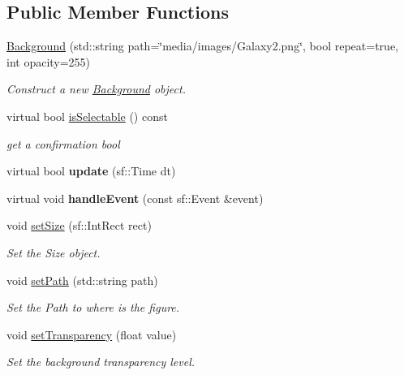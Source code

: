 \subsection*{Public Member Functions}
\begin{DoxyCompactItemize}
\item 
\hyperlink{classBackground_a7b34d3f65318880a36d9db9a5df60d85}{Background} (std\+::string path=\char`\"{}media/images/Galaxy2.\+png\char`\"{}, bool repeat=true, int opacity=255)
\begin{DoxyCompactList}\small\item\em Construct a new \hyperlink{classBackground}{Background} object. \end{DoxyCompactList}\item 
virtual bool \hyperlink{classBackground_acc764dce6ac4f8843bc9950dad313ee4}{is\+Selectable} () const
\begin{DoxyCompactList}\small\item\em get a confirmation bool \end{DoxyCompactList}\item 
\mbox{\label{classBackground_a931546a41fa369074a955f806f7013ba}} 
virtual bool {\bfseries update} (sf\+::\+Time dt)
\item 
\mbox{\label{classBackground_ad8df5f7d22a79df18fb9b12058b09eb8}} 
virtual void {\bfseries handle\+Event} (const sf\+::\+Event \&event)
\item 
void \hyperlink{classBackground_a015a2adae388abae75d6451273c61099}{set\+Size} (sf\+::\+Int\+Rect rect)
\begin{DoxyCompactList}\small\item\em Set the Size object. \end{DoxyCompactList}\item 
void \hyperlink{classBackground_a3c7b1c14ebc2ddad845e55eb2e214ce5}{set\+Path} (std\+::string path)
\begin{DoxyCompactList}\small\item\em Set the Path to where is the figure. \end{DoxyCompactList}\item 
void \hyperlink{classBackground_adee3f510209c8a2a53b4b2b2d27d27e5}{set\+Transparency} (float value)
\begin{DoxyCompactList}\small\item\em Set the background transparency level. \end{DoxyCompactList}\end{DoxyCompactItemize}


